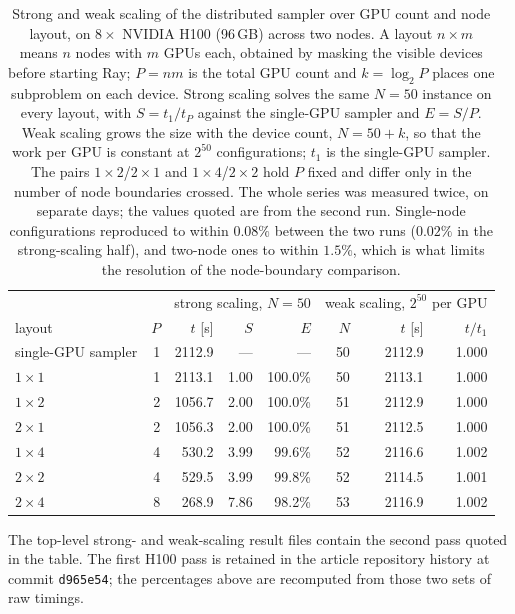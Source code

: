 \documentclass[preprint,12pt,a4paper]{elsarticle}
\begin{document}
\begin{table}[H]
\setlength{\tabcolsep}{4pt}
\centering
\small
\begin{tabular}{|l|r|rrr|rrr|}
\hline
 &  & \multicolumn{3}{c|}{strong scaling, $N=50$} &
\multicolumn{3}{c|}{weak scaling, $2^{50}$ per GPU} \\
layout & $P$ & $t$ [s] & $S$ & $E$ & $N$ & $t$ [s] & $t/t_1$ \\
\hline
single-GPU sampler & 1 & 2112.9 & --- & --- & 50 & 2112.9 & 1.000 \\
$1\times1$ & 1 & 2113.1 & 1.00 & 100.0\% & 50 & 2113.1 & 1.000 \\
$1\times2$ & 2 & 1056.7 & 2.00 & 100.0\% & 51 & 2112.9 & 1.000 \\
$2\times1$ & 2 & 1056.3 & 2.00 & 100.0\% & 51 & 2112.5 & 1.000 \\
$1\times4$ & 4 & 530.2  & 3.99 & 99.6\%  & 52 & 2116.6 & 1.002 \\
$2\times2$ & 4 & 529.5  & 3.99 & 99.8\%  & 52 & 2114.5 & 1.001 \\
$2\times4$ & 8 & 268.9  & 7.86 & 98.2\%  & 53 & 2116.9 & 1.002 \\
\hline
\end{tabular}
\caption{Strong and weak scaling of the distributed sampler over GPU count and node layout,
on $8\times$ NVIDIA H100 (96\,GB) across two nodes. A layout $n\times m$ means $n$ nodes with
$m$ GPUs each, obtained by masking the visible devices before starting Ray; $P=nm$ is the
total GPU count and $k=\log_2 P$ places one subproblem on each device. Strong scaling solves
the same $N=50$ instance on every layout, with $S=t_1/t_P$ against the single-GPU sampler and
$E=S/P$. Weak scaling grows the size with the device count, $N=50+k$, so that the work per GPU
is constant at $2^{50}$ configurations; $t_1$ is the single-GPU sampler. The pairs
$1\times2$/$2\times1$ and $1\times4$/$2\times2$ hold $P$ fixed and differ only in the number of
node boundaries crossed. The whole series was measured twice, on separate days; the values
quoted are from the second run. Single-node configurations reproduced to within $0.08\%$
between the two runs ($0.02\%$ in the strong-scaling half), and two-node ones to within
$1.5\%$, which is what limits the resolution of
the node-boundary comparison.}
\label{tab:scaling}
\end{table}

The top-level strong- and weak-scaling result files contain the second pass quoted in the table. The first H100
pass is retained in the article repository history at commit \texttt{d965e54}; the percentages
above are recomputed from those two sets of raw timings.
\end{document}
